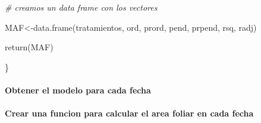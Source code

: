 \documentclass[
]{article}
\newenvironment{Shaded}{\begin{snugshade}}{\end{snugshade}}
\newcommand{\CommentTok}[1]{\textcolor[rgb]{0.56,0.35,0.01}{\textit{#1}}}
\newcommand{\FunctionTok}[1]{\textcolor[rgb]{0.00,0.00,0.00}{#1}}
\newcommand{\NormalTok}[1]{#1}
\newcommand{\OtherTok}[1]{\textcolor[rgb]{0.56,0.35,0.01}{#1}}
\newcommand{\SpecialCharTok}[1]{\textcolor[rgb]{0.00,0.00,0.00}{#1}}
\begin{document}
\begin{Shaded}
\begin{Highlighting}[]
 \CommentTok{\# creamos un data frame con los vectores}

\NormalTok{MAF}\OtherTok{\textless{}{-}}\FunctionTok{data.frame}\NormalTok{(tratamientos, ord, prord, pend, prpend, rsq, radj)}

\FunctionTok{return}\NormalTok{(MAF)}
    
\NormalTok{\}}
\end{Highlighting}
\end{Shaded}

\hypertarget{obtener-el-modelo-para-cada-fecha}{%
\paragraph{Obtener el modelo para cada
fecha}\label{obtener-el-modelo-para-cada-fecha}}

\begin{Shaded}
\end{Shaded}

\hypertarget{crear-una-funcion-para-calcular-el-area-foliar-en-cada-fecha}{%
\paragraph{Crear una funcion para calcular el area foliar en cada
fecha}\label{crear-una-funcion-para-calcular-el-area-foliar-en-cada-fecha}}
\end{document}
